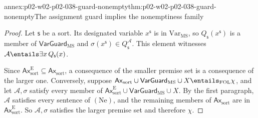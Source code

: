 \begin{annexitem}{annex:p02-w02-p02-038-guard-nonempty}{thm:p02-w02-p02-038-guard-nonempty}{The assignment guard implies the nonemptiness family}
\begin{proof}
Let \(\mathsf s\) be a sort.  Its designated variable \(x^{\mathsf s}\) is in
\(\mathrm{Var}_{\mathrm{MS}}\), so \(Q_{\mathsf s}(x^{\mathsf s})\) is a
member of \(\mathsf{VarGuard}_{\mathrm{MS}}\) and
\(\sigma(x^{\mathsf s})\in Q_{\mathsf s}^{\mathcal A}\).  This element
witnesses \(\mathcal A\entails\exists x\,Q_{\mathsf s}(x)\).

Since
\(\mathsf{Ax}^{\mathrm E}_{\mathrm{sort}}\subseteq\mathsf{Ax}_{\mathrm{sort}}\),
a consequence of the smaller premise set is a consequence of the larger one.
Conversely, suppose \(\mathsf{Ax}_{\mathrm{sort}}\cup
\mathsf{VarGuard}_{\mathrm{MS}}\cup X\entails_{\mathrm{FOL}}\chi\), and let
\(\mathcal A,\sigma\) satisfy every member of
\(\mathsf{Ax}^{\mathrm E}_{\mathrm{sort}}\cup\mathsf{VarGuard}_{\mathrm{MS}}
\cup X\).  By the first paragraph, \(\mathcal A\) satisfies every sentence of
\((\mathrm{Ne})\), and the remaining members of
\(\mathsf{Ax}_{\mathrm{sort}}\) are in
\(\mathsf{Ax}^{\mathrm E}_{\mathrm{sort}}\).  So \(\mathcal A,\sigma\)
satisfies the larger premise set and therefore \(\chi\).
\end{proof}
\end{annexitem}

